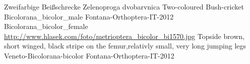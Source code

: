 {Zweifarbige Beißschrecke} %
{Zelenoproga dvobarvnica} %
{Two-coloured Bush-cricket} %
{Bicolorana_bicolor_male} %
{Fontana-Orthoptera-IT-2012}%
{Bicolorana_bicolor_female} %
{\url{http://www.hlasek.com/foto/metrioptera_bicolor_bi1570.jpg}} %
{Topside brown, short winged, black stripe on the femur,relativly small, very long jumping legs} %
{} %
{Veneto-Bicolorana-bicolor} %
{Fontana-Orthoptera-IT-2012}%
